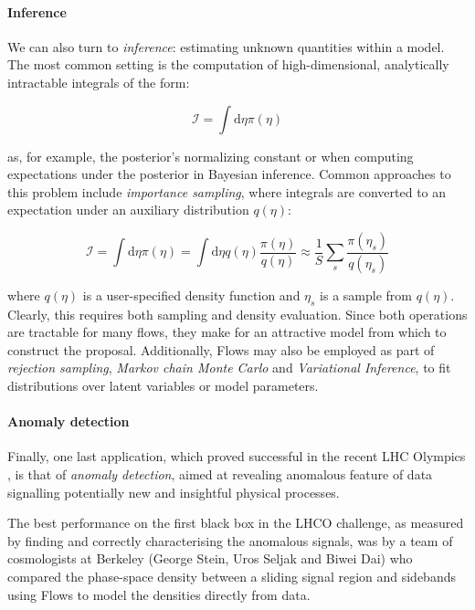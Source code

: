 \paragraph{Inference}
We can also turn to \emph{inference}: estimating unknown quantities within a model. The most common setting is the computation of high-dimensional, analytically intractable integrals of the form: 

\[
\mathcal{I} = \int \text{d}\eta \pi(\eta)
\]

as, for example, the posterior’s normalizing constant or when computing expectations under the posterior in Bayesian inference. Common approaches to this problem include \emph{importance sampling}, where integrals are converted to an expectation under an auxiliary distribution $q(\eta)$:

\[
\mathcal{I} = \int \text{d}\eta \pi(\eta) = \int \text{d}\eta q(\eta) \frac{\pi(\eta)}{q(\eta)} \approx \frac{1}{S}\sum_s \frac{\pi(\eta_s)}{q(\eta_s)}
\]

where $q(\eta)$ is a user-specified density function and $\eta_s$ is a sample from $q(\eta)$. Clearly, this requires both sampling and density evaluation. Since both operations are tractable for many
flows, they make for an attractive model from which to construct the proposal.
Additionally, Flows may also be employed as part of \emph{rejection sampling}, \emph{Markov chain Monte Carlo} and \emph{Variational Inference}, to fit distributions over latent variables or model parameters.

\paragraph{Anomaly detection}

Finally, one last application, which proved successful in the recent LHC Olympics \cite{Kasieczka_2021}, is that of \emph{anomaly detection}, aimed at revealing anomalous feature of data signalling potentially new and insightful physical processes.

The best performance on the first black box in the LHCO challenge, as measured by finding and correctly characterising the anomalous signals, was by a team of cosmologists at Berkeley (George Stein, Uros Seljak and Biwei Dai) who compared the phase-space density between a sliding signal region and sidebands using Flows to model the densities directly from data.

